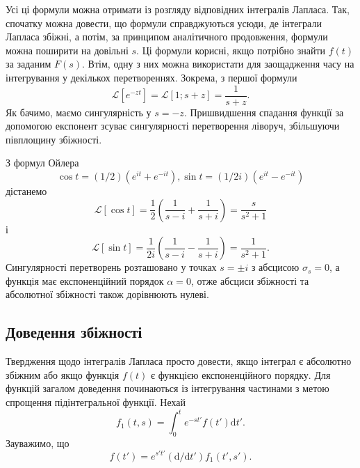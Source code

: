 \documentclass[14pt,twoside]{extreport}
\theoremstyle{mystyle}
\numberwithin{equation}{chapter}
\begin{document}
Усі ці формули можна отримати із розгляду відповідних інтегралів Лапласа. Так, спочатку можна довести, що формули справджуються усюди, де інтеграли Лапласа збіжні, а потім, за принципом аналітичного продовження, формули можна поширити на довільні $s$. Ці формули корисні, якщо потрібно знайти $f(t)$ за заданим $F(s)$. Втім, одну з них можна використати для заощадження часу на інтегрування у декількох перетвореннях. Зокрема, з першої формули
\begin{equation*}
	\mathcal{L}[e^{-zt}]=\mathcal{L}[1;s+z]=\dfrac{1}{s+z}.
\end{equation*}
Як бачимо, маємо сингулярність у $s=-z$. Пришвидшення спадання функції за допомогою експонент зсуває сингулярності перетворення ліворуч, збільшуючи півплощину збіжності.

З формул Ойлера
\begin{equation*}
	\cos t=(1/2)(e^{it}+e^{-it}), \sin t=(1/2i)(e^{it}-e^{-it})
\end{equation*}
дістанемо
\begin{equation*}
	\mathcal{L}[\displaystyle \cos t]=\frac{1}{2}\left(\frac{1}{s-i}+\frac{1}{s+i}\right)=\dfrac{s}{s^{2}+1}
\end{equation*}
і
\begin{equation*}
	\mathcal{L}[\displaystyle \sin t]=\frac{1}{2i}\left(\frac{1}{s-i}-\frac{1}{s+i}\right)=\dfrac{1}{s^{2}+1}.
\end{equation*}
Сингулярності перетворень розташовано у точках $s=\pm i$ з абсцисою $\sigma_{s}=0$, а функція має експоненційний порядок $\alpha=0$, отже абсциси збіжності та абсолютної збіжності також дорівнюють нулеві.

\subsection{Доведення збіжності}

Твердження щодо інтегралів Лапласа просто довести, якщо інтеграл є абсолютно збіжним або якщо функція $f(t)$ є функцією експоненційного порядку. Для функцій загалом доведення починаються із інтегрування частинами з метою спрощення підінтегральної функції. Нехай
\begin{equation}\label{fone}
	f_{1}(t,\displaystyle  s)=\int_{0}^{t}e^{-st'}f(t')\mathrm{d}t'.
\end{equation}
Зауважимо, що
\begin{equation}\label{ftprime}
	f(t')=e^{s't'}(\mathrm{d}/\mathrm{d}t')f_{1}(t',s').
\end{equation}
\end{document}
